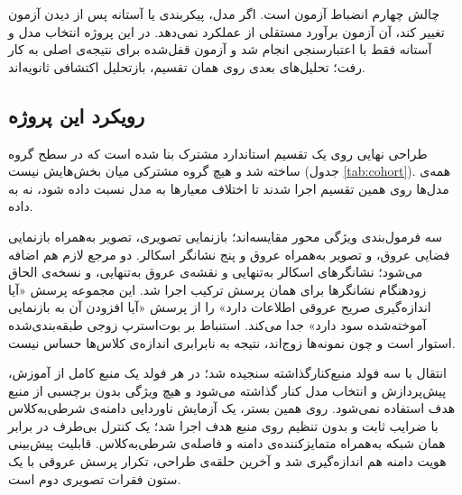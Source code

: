 چالش چهارم انضباط آزمون است. اگر مدل، پیکربندی یا آستانه پس از دیدن آزمون تغییر کند، آن آزمون برآورد مستقلی از عملکرد نمی‌دهد. در این پروژه انتخاب مدل و آستانه فقط با اعتبارسنجی انجام شد و آزمون قفل‌شده برای نتیجه‌ی اصلی به کار رفت؛ تحلیل‌های بعدی روی همان تقسیم، بازتحلیل اکتشافی ثانویه‌اند.

\subsection{رویکرد این پروژه}

طراحی نهایی روی یک تقسیم استاندارد مشترک بنا شده است که در سطح گروه ساخته شد و هیچ گروه مشترکی میان بخش‌هایش نیست (جدول \autoref{tab:cohort}). همه‌ی مدل‌ها روی همین تقسیم اجرا شدند تا اختلاف معیارها به مدل نسبت داده شود، نه به داده.

سه فرمول‌بندی ویژگی محور مقایسه‌اند؛ بازنمایی تصویری، تصویر به‌همراه بازنمایی فضایی عروق، و تصویر به‌همراه عروق و پنج نشانگر اسکالر. دو مرجع لازم هم اضافه می‌شود؛ نشانگرهای اسکالر به‌تنهایی و نقشه‌ی عروق به‌تنهایی، و نسخه‌ی الحاق زودهنگام نشانگرها برای همان پرسش ترکیب اجرا شد. این مجموعه پرسش «آیا اندازه‌گیری صریح عروقی اطلاعات دارد» را از پرسش «آیا افزودن آن به بازنمایی آموخته‌شده سود دارد» جدا می‌کند. استنباط بر بوت‌استرپ زوجی طبقه‌بندی‌شده استوار است و چون نمونه‌ها زوج‌اند، نتیجه به نابرابری اندازه‌ی کلاس‌ها حساس نیست.

انتقال با سه فولد منبع‌کنارگذاشته سنجیده شد؛ در هر فولد یک منبع کامل از آموزش، پیش‌پردازش و انتخاب مدل کنار گذاشته می‌شود و هیچ ویژگی بدون برچسبی از منبع هدف استفاده نمی‌شود. روی همین بستر، یک آزمایش ناوردایی دامنه‌ی شرطی‌به‌کلاس با ضرایب ثابت و بدون تنظیم روی منبع هدف اجرا شد؛ یک کنترل بی‌طرف در برابر همان شبکه به‌همراه متمایزکننده‌ی دامنه و فاصله‌ی  شرطی‌به‌کلاس. قابلیت پیش‌بینی هویت دامنه هم اندازه‌گیری شد و آخرین حلقه‌ی طراحی، تکرار پرسش عروقی با یک ستون فقرات تصویری دوم است.
